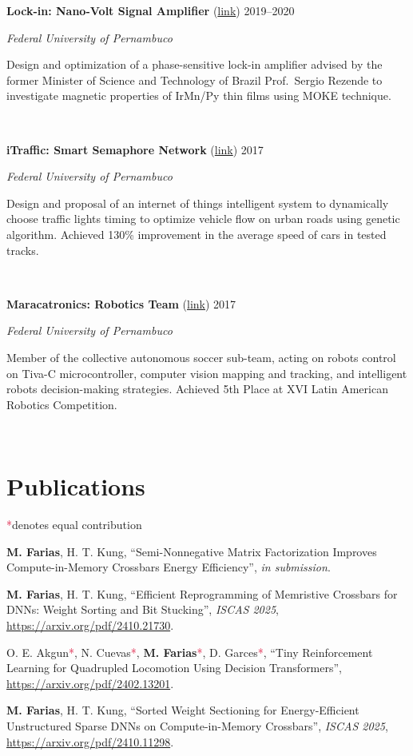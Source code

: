 \documentclass[letterpaper,10pt]{article}
\newcommand{\entry}[4]{

\begin{minipage}[t]{.15\textwidth}
\end{minipage}
\hfill\vline\hfill 
\begin{minipage}[t]{0.95\textwidth}
#2 \hfill \textsc{#1}

\textit{#3}

\footnotesize{#4}
\end{minipage}\\\vspace{.25cm}}
\newcommand{\ufpe}{Federal University of Pernambuco}
\newcommand{\co}{\textcolor{crimson}{*}}
\begin{document}
\entry{2019--2020}{\textbf{Lock-in: Nano-Volt Signal Amplifier} (\href{https://www.matheussfarias.com/lockin.html}{link})}{\ufpe}{
	Design and optimization of a phase-sensitive lock-in amplifier advised by the former Minister of Science and Technology of Brazil Prof.\ Sergio Rezende to investigate magnetic properties of IrMn/Py thin films using MOKE technique.
}

\entry{2017}{\textbf{iTraffic: Smart Semaphore Network} (\href{https://www.matheussfarias.com/itraffic.html}{link})}{\ufpe}{
	Design and proposal of an internet of things intelligent system to dynamically choose traffic lights timing to optimize vehicle flow on urban roads using genetic algorithm. Achieved 130\% improvement in the average speed of cars in tested tracks.
}

\entry{2017}{\textbf{Maracatronics: Robotics Team} (\href{https://www.matheussfarias.com/maracatronics.html}{link})}{\ufpe}{
	Member of the collective autonomous soccer sub-team, acting on robots control on Tiva-C microcontroller, computer vision mapping and tracking, and intelligent robots decision-making strategies. Achieved 5th Place at XVI Latin American Robotics Competition.
}

\vspace*{-.25cm}

\section{Publications}
\co denotes equal contribution
\vspace*{.1cm}
\begin{etaremune}
	\renewcommand{\labelenumi}{[\theenumi]}
    \item \textbf{M. Farias}, H. T. Kung, ``Semi-Nonnegative Matrix Factorization Improves Compute-in-Memory Crossbars Energy Efficiency'', \textit{in submission}.
	\item \textbf{M. Farias}, H. T. Kung, ``Efficient Reprogramming of Memristive Crossbars for DNNs: Weight Sorting and Bit Stucking'', \textit{ISCAS 2025}, \href{https://arxiv.org/pdf/2410.21730}{https://arxiv.org/pdf/2410.21730}.
    \item O. E. Akgun\co, N. Cuevas\co, \textbf{M. Farias}\co, D. Garces\co, ``Tiny Reinforcement Learning for Quadrupled Locomotion Using Decision Transformers'', \href{https://arxiv.org/pdf/2402.13201}{https://arxiv.org/pdf/2402.13201}.
	\item \textbf{M. Farias}, H. T. Kung, ``Sorted Weight Sectioning for Energy-Efficient Unstructured Sparse DNNs on Compute-in-Memory Crossbars'', \textit{ISCAS 2025}, \href{https://arxiv.org/pdf/2410.11298}{https://arxiv.org/pdf/2410.11298}.
\end{etaremune}
\vspace*{-.25cm}
\end{document}
